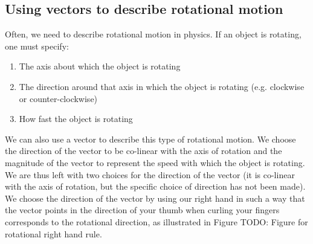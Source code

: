 \subsection{Using vectors to describe rotational motion}
Often, we need to describe rotational motion in physics. If an object is rotating, one must specify:
\begin{enumerate}
\item The axis about which the object is rotating
\item The direction around that axis in which the object is rotating (e.g. clockwise or counter-clockwise)
\item How fast the object is rotating
\end{enumerate}
We can also use a vector to describe this type of rotational motion. We choose the direction of the vector to be co-linear with the axis of rotation and the magnitude of the vector to represent the speed with which the object is rotating. We are thus left with two choices for the direction of the vector (it is co-linear with the axis of rotation, but the specific choice of direction has not been made). We choose the direction of the vector by using our right hand in such a way that the vector points in the direction of your thumb when curling your fingers corresponds to the rotational direction, as illustrated in Figure TODO: Figure for rotational right hand rule.


